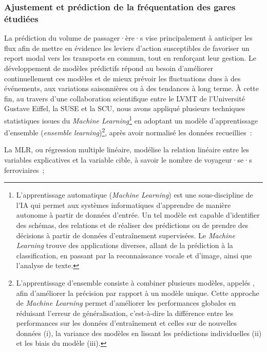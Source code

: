 \begin{refsegment}
\subsubsection*{Ajustement et prédiction de la fréquentation des gares étudiées
    \label{chap6:methodologie-indicateurs-frequentation-prediction}
    }

La prédiction du volume de passager·ère·s vise principalement à anticiper les flux afin de mettre en évidence les leviers d’action susceptibles de favoriser un report modal vers les transports en commun, tout en renforçant leur gestion. Le développement de modèles prédictifs répond au besoin d’améliorer continuellement ces modèles et de mieux prévoir les fluctuations dues à des événements, aux variations saisonnières ou à des tendances à long terme. À cette fin, au travers d’une collaboration scientifique entre le \acrfull{LVMT} de l'Université Gustave Eiffel, la \acrfull{SUSE} et la \acrfull{SCU}, nous avons appliqué plusieurs techniques statistiques issues du \textsl{Machine Learning}\footnote{
    L’apprentissage automatique (\textsl{Machine Learning}) est une sous-discipline de l’\acrfull{IA} qui permet aux systèmes informatiques d’apprendre de manière autonome à partir de données d'entrée. Un tel modèle est capable d’identifier des schémas, des relations et de réaliser des prédictions ou de prendre des décisions à partir de données d’entraînement supervisées. Le \textsl{Machine Learning} trouve des applications diverses, allant de la prédiction à la classification, en passant par la reconnaissance vocale et d’image, ainsi que l’analyse de texte. 
} en adoptant un modèle d'apprentissage d'ensemble (\textsl{ensemble learning})\footnote{
    L’apprentissage d'ensemble consiste à combiner plusieurs modèles, appelés , afin d’améliorer la précision par rapport à un modèle unique. Cette approche de \textsl{Machine Learning} permet d’améliorer les performances globales en réduisant l’erreur de généralisation, c’est-à-dire la différence entre les performances sur les données d’entraînement et celles sur de nouvelles données (i), la variance des modèles en lissant les prédictions individuelles (ii) et les biais du modèle (iii).
}, après avoir normalisé les données recueillies~:
\begin{customitemize}
    \item La \acrfull{MLR}, ou régression multiple linéaire, modélise la relation linéaire entre les variables explicatives et la variable cible, à savoir le nombre de voyageur·se·s ferroviaires~;

\end{customitemize}
\end{refsegment}
